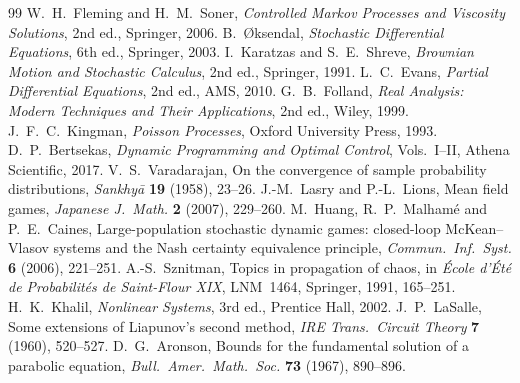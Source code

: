 \documentclass[11pt]{article}
\begin{document}
\begin{thebibliography}{99}
 W.~H.~Fleming and H.~M.~Soner,
  \emph{Controlled Markov Processes and Viscosity Solutions}, 2nd ed.,
  Springer, 2006.
 B.~\O ksendal,
  \emph{Stochastic Differential Equations}, 6th ed., Springer, 2003.
 I.~Karatzas and S.~E.~Shreve,
  \emph{Brownian Motion and Stochastic Calculus}, 2nd ed., Springer, 1991.
 L.~C.~Evans,
  \emph{Partial Differential Equations}, 2nd ed., AMS, 2010.
 G.~B.~Folland,
  \emph{Real Analysis: Modern Techniques and Their Applications}, 2nd ed.,
  Wiley, 1999.
 J.~F.~C.~Kingman,
  \emph{Poisson Processes}, Oxford University Press, 1993.
 D.~P.~Bertsekas,
  \emph{Dynamic Programming and Optimal Control}, Vols.~I--II, Athena
  Scientific, 2017.
 V.~S.~Varadarajan,
  On the convergence of sample probability distributions,
  \emph{Sankhy\=a} \textbf{19} (1958), 23--26.
 J.-M.~Lasry and P.-L.~Lions,
  Mean field games, \emph{Japanese J.~Math.} \textbf{2} (2007), 229--260.
 M.~Huang, R.~P.~Malham\'e and P.~E.~Caines,
  Large-population stochastic dynamic games: closed-loop McKean--Vlasov systems
  and the Nash certainty equivalence principle,
  \emph{Commun.~Inf.~Syst.} \textbf{6} (2006), 221--251.
 A.-S.~Sznitman,
  Topics in propagation of chaos, in \emph{\'Ecole d'\'Et\'e de Probabilit\'es
  de Saint-Flour XIX}, LNM~1464, Springer, 1991, 165--251.
 H.~K.~Khalil,
  \emph{Nonlinear Systems}, 3rd ed., Prentice Hall, 2002.
 J.~P.~LaSalle,
  Some extensions of Liapunov's second method,
  \emph{IRE Trans.~Circuit Theory} \textbf{7} (1960), 520--527.
 D.~G.~Aronson,
  Bounds for the fundamental solution of a parabolic equation,
  \emph{Bull.~Amer.~Math.~Soc.} \textbf{73} (1967), 890--896.
\end{thebibliography}
\end{document}
